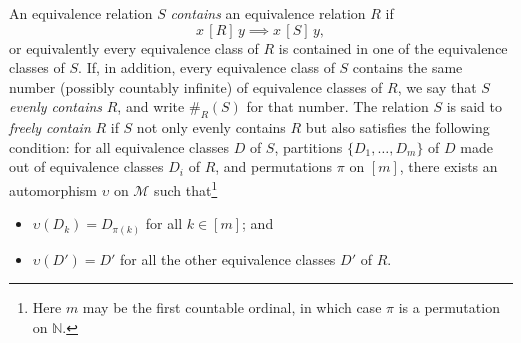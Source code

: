 \documentclass[AHL,Unicode,longabstracts,published]{cedram}
\newcommand*\MM{\mathcal{M}}
\begin{document}
\begin{defi}\label{def: freely contains}
An equivalence relation $S$ \emph{contains} an equivalence relation $R$ if
\[
x\,[R]\,y \implies x\,[S]\,y,
\]
or equivalently every equivalence class of $R$ is contained in one of the equivalence classes of $S$. If, in addition, every equivalence class of $S$ contains the same number (possibly countably infinite) of equivalence classes of $R$, we say that $S$ \emph{evenly contains} $R$, and write $\#_R(S)$ for that number. The relation $S$ is said to \emph{freely contain} $R$ if $S$ not only evenly contains $R$ but also satisfies the following condition: for all equivalence classes $D$ of $S$, partitions $\{D_1,\ldots,D_m\}$ of $D$ made out of equivalence classes $D_i$ of $R$, and permutations $\pi$ on $[m]$, there exists an automorphism $\upsilon$ on $\MM$ such that\footnote{Here $m$ may be the first countable ordinal, in which case $\pi$ is a permutation on $\mathbb{N}$.}
\begin{itemize}
\item $\upsilon(D_k) = D_{\pi(k)}$ for all $k\in [m]$; and
\item $\upsilon(D')=D'$ for all the other equivalence classes $D'$ of $R$.
\end{itemize}
\end{defi}
\end{document}
